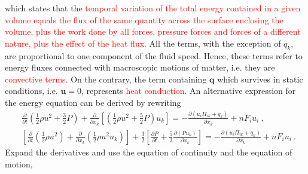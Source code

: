\documentclass[12pt,a4paper]{article}
\renewcommand{\vec}[1]{\boldsymbol{#1}}
\begin{document}
which states that the \textcolor{red}{temporal variation of the total energy contained in a given volume equals the flux of the same quantity across the surface enclosing the volume, plus the work done by all forces, pressure forces and forces of a different nature, plus the effect of the heat flux}. All the terms, with the exception of $q_k$, are proportional to one component of the fluid speed. Hence, these terms refer to energy fluxes connected with macroscopic motions of matter, i.e. they are \textcolor{red}{convective terms}. On the contrary, the term containing $\vec{q}$ which survives in static conditions, i.e. $\vec{u} = 0$, represents \textcolor{red}{heat conduction}.
An alternative expression for the energy equation can be derived by rewriting
\begin{align*}
& \boxed{\frac{\partial}{\partial t} \left(\frac{1}{2}\rho u^2 +\frac{3}{2}P \right) +\frac{\partial}{\partial x_k} \left[\left(\frac{1}{2}\rho u^2 +\frac{5}{2}P \right)u_k \right] = -\frac{\partial (u_i\Pi_{ik} +q_k)}{\partial x_k} +nF_i u_i }~, \\
& \left[ \frac{\partial}{\partial t}\left(\frac{1}{2}\rho u^2 \right) +\frac{\partial}{\partial x_k} \left(\frac{1}{2}\rho u^2 u_k \right) \right] +\frac{3}{2} \left[\frac{\partial P}{\partial t} +\frac{5}{3} \frac{\partial (Pu_k)}{\partial x_k}\right] = -\frac{\partial \left(u_i \Pi_{ik} +q_k \right)}{\partial x_k} +n F_i u_i ~.
\end{align*}
Expand the derivatives and use the equation of continuity and the equation of motion,
\end{document}
